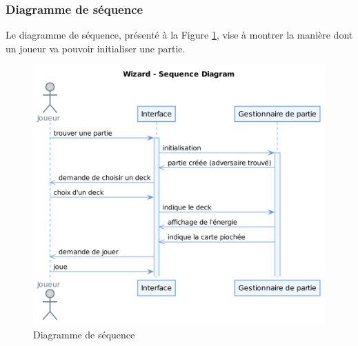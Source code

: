 \documentclass[11pt,a4paper]{article}
\begin{document}
\subsubsection{Diagramme de séquence}

Le diagramme de séquence, présenté à la Figure \ref{fig:seq}, vise à montrer la manière dont un joueur va
pouvoir initialiser une partie.

\begin{figure}[ht]
  \centering
  \includegraphics[width=1\textwidth]{assets/uml/SequenceDiagram.png}
  \caption{\label{fig:seq} Diagramme de séquence}
\end{figure}
\end{document}
